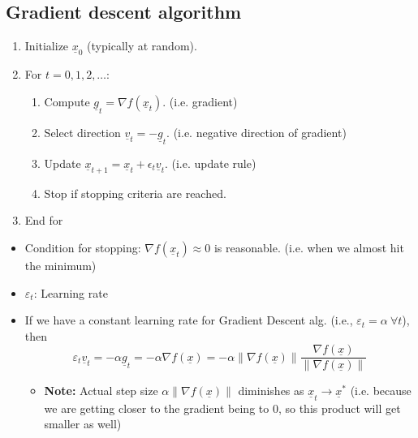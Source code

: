 \subsection{Gradient descent algorithm}
\begin{definition}
    \begin{enumerate}
        \item Initialize $\underline{x}_0$ (typically at random).
        \item For $t = 0, 1, 2, \dots$:
        \begin{enumerate}
            \item Compute $\underline{g}_t = \nabla f(\underline{x}_t)$. (i.e. gradient)
            \item Select direction $\underline{v}_t = -\underline{g}_t$. (i.e. negative direction of gradient)
            \item Update $\underline{x}_{t+1} = \underline{x}_t + \epsilon_t \underline{v}_t$. (i.e. update rule)
            \item Stop if stopping criteria are reached.
        \end{enumerate}
        \item End for
    \end{enumerate}
    \vspace{1em}

    \begin{itemize}
        \item Condition for stopping: \( \nabla f(\underline{x}_t) \approx 0 \) is reasonable. (i.e. when we almost hit the minimum)

        \item \( \varepsilon_t \): Learning rate

        \item If we have a constant learning rate for Gradient Descent alg. (i.e., \( \varepsilon_t = \alpha \ \forall t \)), then
        \[
        \varepsilon_t \underline{v}_t = -\alpha \underline{g}_t = -\alpha \nabla f(\underline{x}) = -\alpha \|\nabla f(\underline{x})\| \frac{\nabla f(\underline{x})}{\|\nabla f(\underline{x})\|}
        \]
        \begin{itemize}
            \item \textbf{Note:} Actual step size $\alpha \|\nabla f(\underline{x})\|$ diminishes as \( \underline{x}_t \rightarrow \underline{x}^* \) (i.e. because we are getting closer to the gradient being to 0, so this product will get smaller as well)
        \end{itemize}
    \end{itemize}
\end{definition}

